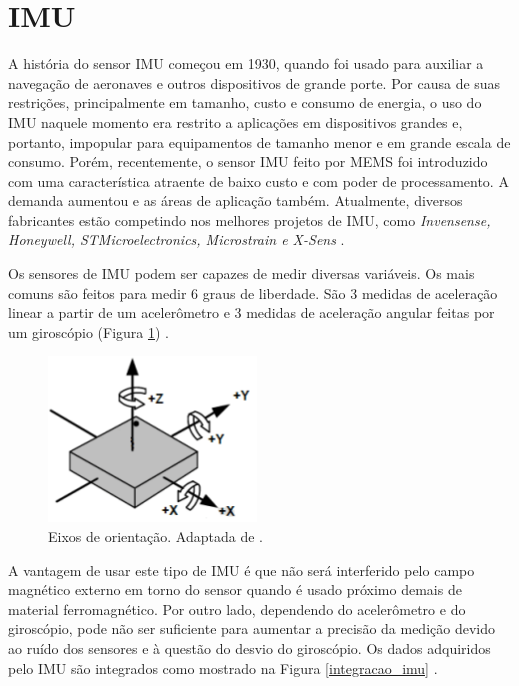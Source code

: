 	\section{IMU}

		A história do sensor IMU começou em 1930, quando foi usado para auxiliar a navegação de aeronaves e outros dispositivos de grande porte. Por causa de suas restrições, principalmente em tamanho, custo e consumo de energia, o uso do IMU naquele momento era restrito a aplicações em dispositivos grandes e, portanto, impopular para equipamentos de tamanho menor e em grande escala de consumo. Porém, recentemente, o sensor IMU feito por MEMS foi introduzido com uma característica atraente de baixo custo e com poder de processamento. A demanda aumentou e as áreas de aplicação também. Atualmente, diversos fabricantes estão competindo nos melhores projetos de IMU, como \textit{Invensense, Honeywell, STMicroelectronics, Microstrain e X-Sens} \cite{ahmad2013}.
		
		Os sensores de IMU podem ser capazes de medir diversas variáveis. Os mais comuns são feitos para medir 6 graus de liberdade. São 3 medidas de aceleração linear a partir de um acelerômetro e 3 medidas de aceleração angular feitas por um giroscópio (Figura \ref{eixos_imu}) \cite{santos2016}.
		 
		\begin{figure}[h!]
			\centering
			\includegraphics[keepaspectratio=true,scale=0.8]{figuras/Eixos_imu.png}
			\caption{Eixos de orientação. Adaptada de .}
			\label{eixos_imu}	
		\end{figure}


		A vantagem de usar este tipo de IMU é que não será interferido pelo campo magnético externo em torno do
		sensor quando é usado próximo demais de material ferromagnético. Por outro lado, dependendo do acelerômetro e do giroscópio, pode não ser suficiente para aumentar a precisão da medição devido ao ruído dos sensores e à questão do desvio do giroscópio. Os dados adquiridos pelo IMU são integrados como mostrado na Figura \ref{integracao_imu} \cite{ahmad2013}.

